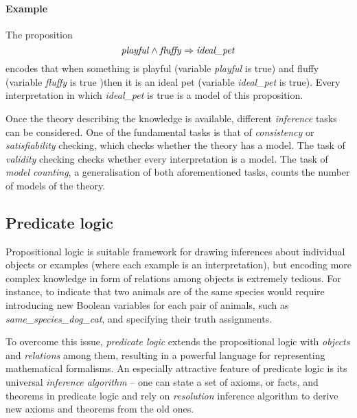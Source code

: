 \paragraph{Example} The proposition
$$\text{\textit{playful}} \wedge \text{\textit{fluffy}} \Rightarrow \text{\textit{ideal\_pet}} $$
encodes that when something is playful (variable \textit{playful} is true) and fluffy (variable \textit{fluffy} is true )then it is an ideal pet (variable \textit{ideal\_pet} is true).
Every interpretation in which \textit{ideal\_pet} is true is a model of this proposition.




Once the theory describing the knowledge is available, different \textit{inference} tasks can be considered.
One of the fundamental tasks is that of \textit{consistency} or \textit{satisfiability} checking, which checks whether the theory has a model.
The task of \textit{validity} checking checks whether every interpretation is a model.
The task of \textit{model counting}, a generalisation of both aforementioned tasks, counts the number of models of the theory.









\subsection{Predicate logic}


Propositional logic is suitable framework for drawing inferences about individual objects or examples (where each example is an interpretation), but encoding more complex knowledge in form of relations among objects is extremely tedious.
For instance, to indicate that two animals are of the same species would require introducing new Boolean variables for each pair of animals, such as \textit{same\_species\_dog\_cat}, and specifying their truth assignments.



To overcome this issue, \textit{predicate logic} extends the propositional logic with \textit{objects} and \textit{relations} among them, resulting in a powerful language for representing mathematical formalisms.
An especially attractive feature of predicate logic is its universal \textit{inference algorithm} -- one can state a set of axioms, or facts, and theorems in predicate logic and rely on \textit{resolution} \cite{Robinson:1965:Resolution} inference algorithm to derive new axioms and theorems from the old ones.



